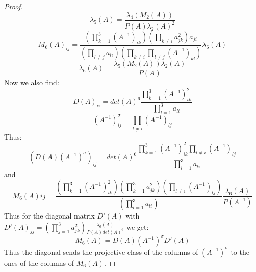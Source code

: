 \documentclass[10pt,a4paper]{amsart}
\begin{document}
\begin{proof}
    \[\lambda_5(A) = \frac{\lambda_4(M_2(A))}{P(A) \lambda_2(A)^2}\]
    \[M_6(A)_{ij} = \frac{(\prod_{k=1}^3(A^{-1})_{ik}) (\prod_{k \neq i}a_{jk}^2)a_{ji}}{(\prod_{l \neq j}a_{li}) (\prod_{k \neq i} \prod_{l \neq j}(A^{-1})_{kl})} \lambda_6(A)\]
    \[\lambda_6(A) = \frac{\lambda_5(M_2(A)) \lambda_2(A)}{P(A)}\]
    Now we also find:
    \[D(A)_{ii} = det(A)^6\frac{\prod_{k=1}^3(A^{-1})_{ik}^2}{\prod_{l=1}^3a_{li}}\]
    \[(A^{-1})^{\sigma}_{ij} = \prod_{l \neq i} (A^{-1})_{lj}\]
    Thus:
    \[(D(A)(A^{-1})^{\sigma})_{ij} = det(A)^6\frac{\prod_{k=1}^3(A^{-1})_{ik}^2\prod_{l \neq i} (A^{-1})_{lj}}{\prod_{l=1}^3a_{li}}\]
    and
    \[M_6(A){ij} = \frac{(\prod_{k=1}^3(A^{-1})^2_{ik}) (\prod_{k = 1}^3a_{jk}^2)(\prod_{l \neq i}(A^{-1})_{lj})}{(\prod_{l = 1}^3a_{li})} \frac{\lambda_6(A)}{P(A^{-1})}\]
    Thus for the diagonal matrix $D'(A)$ with $D'(A)_{jj} = (\prod_{j=1}^3a_{jk}^2) \frac{\lambda_6(A)}{P(A)det(A)^6}$ we get:
    \[M_6(A) = D(A) (A^{-1})^{\sigma}D'(A)\]
    Thus the diagonal sends the projective class of the columns of $(A^{-1})^{\sigma}$ to the ones of the columns of $M_6(A)$.
\end{proof}
\end{document}
